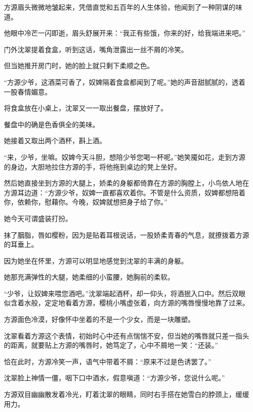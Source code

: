 
\begin{this_body}



方源眉头微微地皱起来，凭借直觉和五百年的人生体验，他闻到了一种阴谋的味道。

他眼中冷芒一闪即逝，眉头舒展开来：“我正有些饿，你来的好，给我端进来吧。”

门外沈翠提着食盒，听到这话，嘴角泄露出一丝不屑的冷笑。

但当她推开房门时，她的脸上就只剩下柔顺之色。

“方源少爷，这酒菜可香了，奴婢隔着食盒都闻到了呢。”她的声音甜腻腻的，透着一股春情媚意。

将食盒放在小桌上，沈翠又一一取出餐盘，摆放好了。

餐盘中的确是色香俱全的美味。

她接着又取出两个酒杯，斟上酒。

“来，少爷，坐嘛。奴婢今天斗胆，想陪少爷您喝一杯呢。”她笑魇如花，走到方源的身边，大胆地拉住方源的手，将他拖到桌边的凳上坐好。

然后她直接坐到方源的大腿上，娇柔的身躯都倚靠在方源的胸膛上，小鸟依人地在方源耳边道：“方源少爷，奴婢一直都喜欢着你。不管是什么资质，奴婢都想陪着你，依赖你，慰藉你。今晚，奴婢就想把身子给了你。”

她今天可谓盛装打扮。

抹了胭脂，唇如樱粉，因为是贴着耳根说话，一股娇柔青春的气息，就撩拨着方源的耳垂上。

因为她坐在怀里，方源可以明显地感觉到沈翠的丰满的身躯。

她那充满弹性的大腿，她柔细的小蛮腰，她胸前的柔软。

“少爷，让奴婢来喂您酒吧。”沈翠端起酒杯，却一仰头，将酒抿入口中。然后双眼似含着水般，定定地看着方源，樱桃小嘴虚张着，向方源的嘴唇慢慢地靠了过来。

方源面色冷漠，好像怀中坐着的不是一个少女，而是一块雕塑。

沈翠看着方源这个表情，初始时心中还有点惴惴不安，但当她的嘴唇就只差一指头的距离，就要贴上方源的嘴唇时，她笃定了，心中不屑地一笑：“还装。”

恰在此时，方源冷笑一声，语气中带着不屑：“原来不过是色诱罢了。”

沈翠脸上神情一僵，咽下口中酒水，假意嗔道：“方源少爷，您说什么呢。”

方源双目幽幽散发着冷光，盯着沈翠的眼睛，同时右手搭在她雪白的脖颈上，缓缓用力。


\end{this_body}
